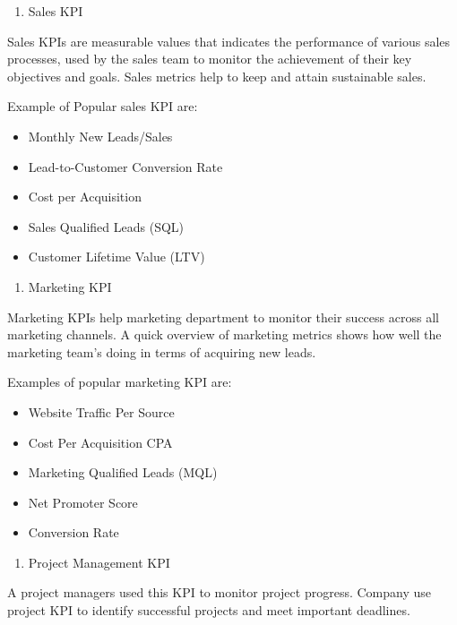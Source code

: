 \documentclass[]{book}
\providecommand{\tightlist}{%
  \setlength{\itemsep}{0pt}\setlength{\parskip}{0pt}}
\begin{document}
\begin{enumerate}
\def\labelenumi{\arabic{enumi}.}
\setcounter{enumi}{2}
\tightlist
\item
  Sales KPI
\end{enumerate}

Sales KPIs are measurable values that indicates the performance of
various sales processes, used by the sales team to monitor the
achievement of their key objectives and goals. Sales metrics help to
keep and attain sustainable sales.

Example of Popular sales KPI are:

\begin{itemize}
\tightlist
\item
  Monthly New Leads/Sales
\item
  Lead-to-Customer Conversion Rate
\item
  Cost per Acquisition
\item
  Sales Qualified Leads (SQL)
\item
  Customer Lifetime Value (LTV)
\end{itemize}

\begin{enumerate}
\def\labelenumi{\arabic{enumi}.}
\setcounter{enumi}{3}
\tightlist
\item
  Marketing KPI
\end{enumerate}

Marketing KPIs help marketing department to monitor their success across
all marketing channels. A quick overview of marketing metrics shows how
well the marketing team's doing in terms of acquiring new leads.

Examples of popular marketing KPI are:

\begin{itemize}
\tightlist
\item
  Website Traffic Per Source
\item
  Cost Per Acquisition CPA
\item
  Marketing Qualified Leads (MQL)
\item
  Net Promoter Score
\item
  Conversion Rate
\end{itemize}

\begin{enumerate}
\def\labelenumi{\arabic{enumi}.}
\setcounter{enumi}{4}
\tightlist
\item
  Project Management KPI
\end{enumerate}

A project managers used this KPI to monitor project progress. Company
use project KPI to identify successful projects and meet important
deadlines.
\end{document}

